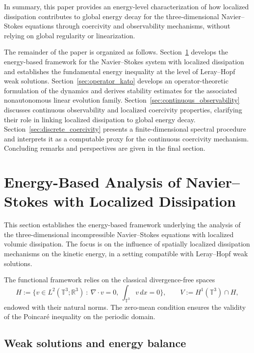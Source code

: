 \documentclass[preprint,12pt]{elsarticle}
\begin{document}
\medskip

In summary, this paper provides an energy-level characterization of how localized
dissipation contributes to global energy decay for the three-dimensional
Navier--Stokes equations through coercivity and observability mechanisms,
without relying on global regularity or linearization.

\medskip

The remainder of the paper is organized as follows.
Section~\ref{sec:energy_stabilization} develops the energy-based framework for
the Navier--Stokes system with localized dissipation and establishes the
fundamental energy inequality at the level of Leray--Hopf weak solutions.
Section~\ref{sec:operator_kato} develops an operator-theoretic formulation of the
dynamics and derives stability estimates for the associated nonautonomous linear
evolution family.
Section~\ref{sec:continuous_observability} discusses continuous observability and
localized coercivity properties, clarifying their role in linking localized
dissipation to global energy decay.
Section~\ref{sec:discrete_coercivity} presents a finite-dimensional spectral
procedure and interprets it as a computable proxy for the continuous coercivity
mechanism.
Concluding remarks and perspectives are given in the final section.

\section{Energy-Based Analysis of Navier--Stokes with Localized Dissipation}
\label{sec:energy_stabilization}

This section establishes the energy-based framework underlying the analysis of
the three-dimensional incompressible Navier--Stokes equations with localized
volumic dissipation.
The focus is on the influence of spatially localized dissipation mechanisms on
the kinetic energy, in a setting compatible with Leray--Hopf weak solutions.

The functional framework relies on the classical divergence-free spaces
\[
H := \Big\{ v\in L^2(\mathbb{T}^3;\mathbb{R}^3)\ :\ \nabla\cdot v = 0,\ 
\int_{\mathbb{T}^3} v\,dx = 0 \Big\},\qquad
V := H^1(\mathbb{T}^3)\cap H,
\]
endowed with their natural norms.
The zero-mean condition ensures the validity of the Poincar\'e inequality on the
periodic domain.

\subsection{Weak solutions and energy balance}
\end{document}
